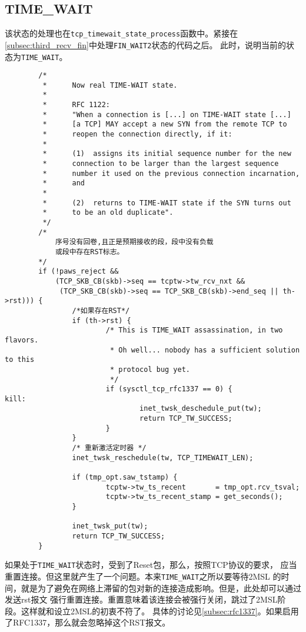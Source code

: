 	\subsection{TIME\_WAIT}
		\label{subsec:time_wait}
			该状态的处理也在\texttt{tcp_timewait_state_process}函数中。紧接在
			\ref{subsec:third_recv_fin}中处理\texttt{FIN_WAIT2}状态的代码之后。
			此时，说明当前的状态为\texttt{TIME_WAIT}。
\begin{verbatim}
        /*
         *      Now real TIME-WAIT state.
         *
         *      RFC 1122:
         *      "When a connection is [...] on TIME-WAIT state [...]
         *      [a TCP] MAY accept a new SYN from the remote TCP to
         *      reopen the connection directly, if it:
         *
         *      (1)  assigns its initial sequence number for the new
         *      connection to be larger than the largest sequence
         *      number it used on the previous connection incarnation,
         *      and
         *
         *      (2)  returns to TIME-WAIT state if the SYN turns out
         *      to be an old duplicate".
         */
        /* 
			序号没有回卷,且正是预期接收的段，段中没有负载
			或段中存在RST标志。
		*/
        if (!paws_reject &&
            (TCP_SKB_CB(skb)->seq == tcptw->tw_rcv_nxt &&
             (TCP_SKB_CB(skb)->seq == TCP_SKB_CB(skb)->end_seq || th->rst))) {
				/*如果存在RST*/
                if (th->rst) {
                        /* This is TIME_WAIT assassination, in two flavors.
                         * Oh well... nobody has a sufficient solution to this
                         * protocol bug yet.
                         */
                        if (sysctl_tcp_rfc1337 == 0) {
kill:
                                inet_twsk_deschedule_put(tw);
                                return TCP_TW_SUCCESS;
                        }
                }
                /* 重新激活定时器 */
                inet_twsk_reschedule(tw, TCP_TIMEWAIT_LEN);

                if (tmp_opt.saw_tstamp) {
                        tcptw->tw_ts_recent       = tmp_opt.rcv_tsval;
                        tcptw->tw_ts_recent_stamp = get_seconds();
                }

                inet_twsk_put(tw);
                return TCP_TW_SUCCESS;
        }
\end{verbatim}
如果处于\texttt{TIME_WAIT}状态时，受到了Reset包，那么，按照TCP协议的要求，
应当重置连接。但这里就产生了一个问题。本来\texttt{TIME_WAIT}之所以要等待2MSL
的时间，就是为了避免在网络上滞留的包对新的连接造成影响。但是，此处却可以通过发送rst报文
强行重置连接。重置意味着该连接会被强行关闭，跳过了2MSL阶段。这样就和设立2MSL的初衷不符了。
具体的讨论见\ref{subsec:rfc1337}。如果启用了RFC1337，那么就会忽略掉这个RST报文。

